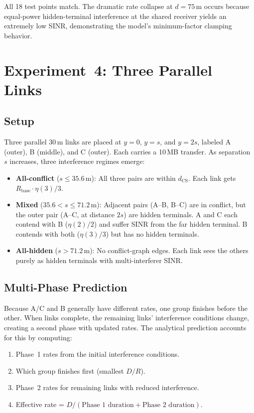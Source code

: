 \documentclass[11pt,a4paper]{article}
\begin{document}
All 18 test points match. The dramatic rate collapse at $d=75\,$m occurs because equal-power hidden-terminal interference at the shared receiver yields an extremely low SINR, demonstrating the model's minimum-factor clamping behavior.

\section{Experiment~4: Three Parallel Links}
\label{sec:exp4}

\subsection{Setup}
Three parallel 30\,m links are placed at $y = 0$, $y = s$, and $y = 2s$, labeled A (outer), B (middle), and C (outer). Each carries a 10\,MB transfer. As separation~$s$ increases, three interference regimes emerge:

\begin{itemize}    \item \textbf{All-conflict} ($s \leq 35.6\,$m): All three pairs are within $d_{\text{CS}}$. Each link gets $R_{\text{base}} \cdot \eta(3)/3$.
    \item \textbf{Mixed} ($35.6 < s \leq 71.2\,$m): Adjacent pairs (A--B, B--C) are in conflict, but the outer pair (A--C, at distance $2s$) are hidden terminals. A and C each contend with B ($\eta(2)/2$) and suffer SINR from the far hidden terminal. B contends with both ($\eta(3)/3$) but has no hidden terminals.
    \item \textbf{All-hidden} ($s > 71.2\,$m): No conflict-graph edges. Each link sees the others purely as hidden terminals with multi-interferer SINR.
\end{itemize}

\subsection{Multi-Phase Prediction}
Because A/C and B generally have different rates, one group finishes before the other. When links complete, the remaining links' interference conditions change, creating a second phase with updated rates. The analytical prediction accounts for this by computing:
\begin{enumerate}
    \item Phase~1 rates from the initial interference conditions.
    \item Which group finishes first (smallest $D/R$).
    \item Phase~2 rates for remaining links with reduced interference.
    \item Effective rate = $D / (\text{Phase~1 duration} + \text{Phase~2 duration})$.
\end{enumerate}
\end{document}
